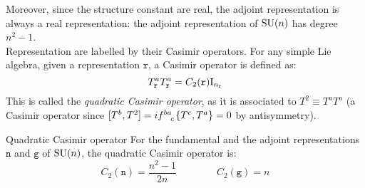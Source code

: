 Moreover, since the structure constant are real, the adjoint representation is always a real representation: the adjoint representation of $ \mathrm{SU}(n) $ has degree $ n^2 - 1 $.\\
Representation are labelled by their Casimir operators. For any simple Lie algebra, given a representation $ \mathtt{r} $, a Casimir operator is defined as:
\begin{equation}
  T^a_\mathtt{r} T^a_\mathtt{r} = C_2(\mathtt{r}) \mathrm{I}_{n_{\mathtt{r}}}
  \label{eq:quad-cas}
\end{equation}
This is called the \textit{quadratic Casimir operator}, as it is associated to $ T^2 \equiv T^a T^a $ (a Casimir operator since $ [T^b, T^2] = i \tensor{f}{^b^a_c} \{T^c,T^a\} = 0 $ by antisymmetry).

\begin{proposition}{Quadratic Casimir operator}{}
  For the fundamental and the adjoint representations $ \mathtt{n} $ and $ \mathtt{g} $ of $ \mathrm{SU}(n) $, the quadratic Casimir operator is:
  \begin{equation}
    C_2(\mathtt{n}) = \frac{n^2 - 1}{2n}
    \qquad \qquad
    C_2(\mathtt{g}) = n
  \end{equation}

  \tcblower


\end{proposition}

